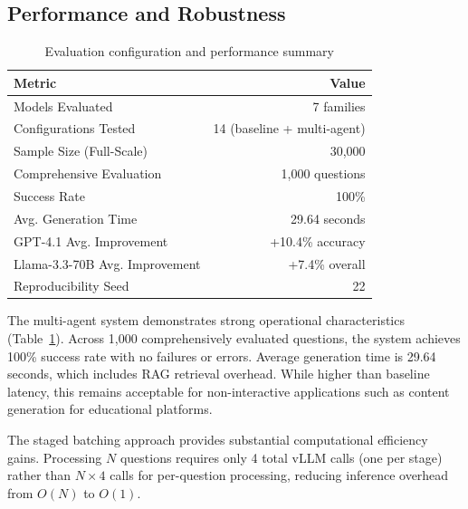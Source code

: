 \subsection{Performance and Robustness}

\begin{table}[h]
\centering
\caption{Evaluation configuration and performance summary}
\label{tab:summary}
\begin{tabular}{lr}
\toprule
\textbf{Metric} & \textbf{Value} \\
\midrule
Models Evaluated & 7 families \\
Configurations Tested & 14 (baseline + multi-agent) \\
Sample Size (Full-Scale) & 30,000 \\
Comprehensive Evaluation & 1,000 questions \\
Success Rate & 100\% \\
Avg. Generation Time & 29.64 seconds \\
GPT-4.1 Avg. Improvement & +10.4\% accuracy \\
Llama-3.3-70B Avg. Improvement & +7.4\% overall \\
Reproducibility Seed & 22 \\
\bottomrule
\end{tabular}
\end{table}

The multi-agent system demonstrates strong operational characteristics (Table~\ref{tab:summary}). Across 1,000 comprehensively evaluated questions, the system achieves 100\% success rate with no failures or errors. Average generation time is 29.64 seconds, which includes RAG retrieval overhead. While higher than baseline latency, this remains acceptable for non-interactive applications such as content generation for educational platforms.

The staged batching approach provides substantial computational efficiency gains. Processing $N$ questions requires only 4 total vLLM calls (one per stage) rather than $N \times 4$ calls for per-question processing, reducing inference overhead from $O(N)$ to $O(1)$.
